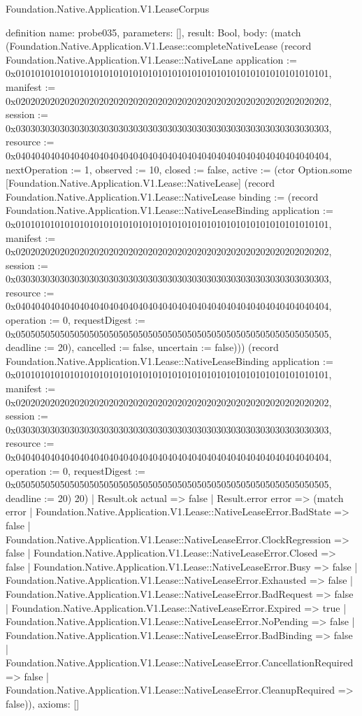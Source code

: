 \begin{lexlean}{Foundation.Native.Application.V1.LeaseCorpus}
\begin{semanticmodule}
definition{
  name: probe035,
  parameters: [],
  result: Bool,
  body: (match (Foundation.Native.Application.V1.Lease::completeNativeLease (record Foundation.Native.Application.V1.Lease::NativeLane {application := 0x0101010101010101010101010101010101010101010101010101010101010101, manifest := 0x0202020202020202020202020202020202020202020202020202020202020202, session := 0x0303030303030303030303030303030303030303030303030303030303030303, resource := 0x0404040404040404040404040404040404040404040404040404040404040404, nextOperation := 1, observed := 10, closed := false, active := (ctor Option.some [Foundation.Native.Application.V1.Lease::NativeLease] (record Foundation.Native.Application.V1.Lease::NativeLease {binding := (record Foundation.Native.Application.V1.Lease::NativeLeaseBinding {application := 0x0101010101010101010101010101010101010101010101010101010101010101, manifest := 0x0202020202020202020202020202020202020202020202020202020202020202, session := 0x0303030303030303030303030303030303030303030303030303030303030303, resource := 0x0404040404040404040404040404040404040404040404040404040404040404, operation := 0, requestDigest := 0x0505050505050505050505050505050505050505050505050505050505050505, deadline := 20}), cancelled := false, uncertain := false}))}) (record Foundation.Native.Application.V1.Lease::NativeLeaseBinding {application := 0x0101010101010101010101010101010101010101010101010101010101010101, manifest := 0x0202020202020202020202020202020202020202020202020202020202020202, session := 0x0303030303030303030303030303030303030303030303030303030303030303, resource := 0x0404040404040404040404040404040404040404040404040404040404040404, operation := 0, requestDigest := 0x0505050505050505050505050505050505050505050505050505050505050505, deadline := 20}) 20)
    | Result.ok actual => false
    | Result.error error => (match error
      | Foundation.Native.Application.V1.Lease::NativeLeaseError.BadState => false
      | Foundation.Native.Application.V1.Lease::NativeLeaseError.ClockRegression => false
      | Foundation.Native.Application.V1.Lease::NativeLeaseError.Closed => false
      | Foundation.Native.Application.V1.Lease::NativeLeaseError.Busy => false
      | Foundation.Native.Application.V1.Lease::NativeLeaseError.Exhausted => false
      | Foundation.Native.Application.V1.Lease::NativeLeaseError.BadRequest => false
      | Foundation.Native.Application.V1.Lease::NativeLeaseError.Expired => true
      | Foundation.Native.Application.V1.Lease::NativeLeaseError.NoPending => false
      | Foundation.Native.Application.V1.Lease::NativeLeaseError.BadBinding => false
      | Foundation.Native.Application.V1.Lease::NativeLeaseError.CancellationRequired => false
      | Foundation.Native.Application.V1.Lease::NativeLeaseError.CleanupRequired => false)),
  axioms: []
}


\end{semanticmodule}
\end{lexlean}
